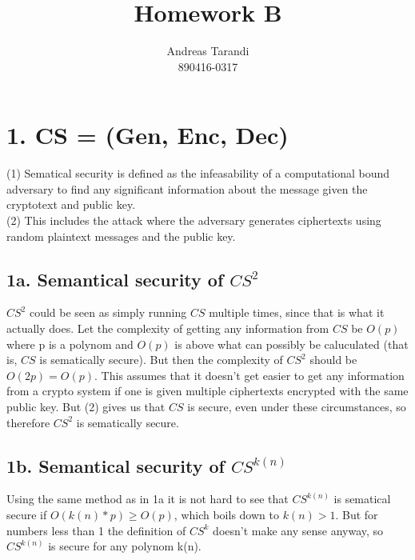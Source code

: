 \documentclass[a4paper,11pt]{article}
\author{Andreas Tarandi\\890416-0317}
\title{Homework B}
\begin{document}
	\maketitle

	\section*{1. CS = (Gen, Enc, Dec)}
		(1) Sematical security is defined as the infeasability of a computational bound adversary to find any significant information about the message given the cryptotext and public key. \\
		(2) This includes the attack where the adversary generates ciphertexts using random plaintext messages and the public key.
	
	\subsection*{1a. Semantical security of $CS^2$}
		$CS^2$ could be seen as simply running $CS$ multiple times, since that is what it actually does. 
		Let the complexity of getting any information from $CS$ be $O(p)$ where p is a polynom and $O(p)$ is above what can possibly be caluculated (that is, $CS$ is sematically secure). 
		But then the complexity of $CS^2$ should be $O(2p) = O(p)$. This assumes that it doesn't get easier to get any information from a crypto system if one is given multiple ciphertexts encrypted with the same public key.
		But (2) gives us that $CS$ is secure, even under these circumstances, so therefore $CS^2$ is sematically secure.

	\subsection*{1b. Semantical security of $CS^{k(n)}$}
		Using the same method as in 1a it is not hard to see that $CS^{k(n)}$ is sematical secure if $O(k(n)*p) \ge O(p)$, which boils down to $k(n) \gt 1$. But for numbers less than 1 the definition of $CS^k$ doesn't make any sense anyway, so $CS^{k(n)}$ is secure for any polynom k(n).
\end{document}
